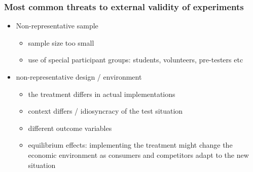 \documentclass[10pt]{article}
\begin{document}
\subsubsection{Most common threats to external validity of experiments}
\begin{itemize}
    \item Non-representative sample
    \begin{itemize}
        \item sample size too small 
        \item use of special participant groups: students, volunteers, pre-testers etc 
    \end{itemize}
    \item non-representative design / environment
    \begin{itemize}
        \item the treatment differs in actual implementations
        \item context differs / idiosyncracy of the test situation 
        \item different outcome variables 
        \item equilibrium effects: implementing the treatment might change the economic environment as consumers and competitors adapt to the new situation 
    \end{itemize}
\end{itemize}
\end{document}
